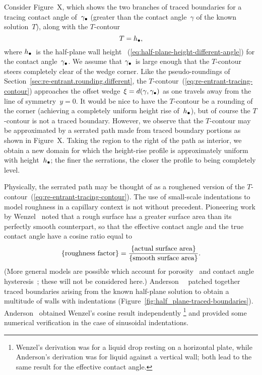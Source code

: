 Consider Figure~X, %
which shows the two branches of traced boundaries
for a tracing contact angle of~$\gamma_\bullet$
(greater than the contact angle~$\gamma$ of the known solution~$T$),
along with the $T$-contour
\begin{equation}
  T = h_\bullet,
  \label{eq:re-entrant-tracing-contour}
\end{equation}
where $h_\bullet$~is the half-plane wall height~%
  (\ref{eq:half-plane-height-different-angle})
for the contact angle~$\gamma_\bullet$.
We assume that $\gamma_\bullet$~is large enough
that the $T$-contour steers completely clear of the wedge corner.
Like the pseudo-roundings of Section~\ref{sec:re-entrant.rounding.different},
the $T$-contour~(\ref{eq:re-entrant-tracing-contour})
approaches the offset wedge~$\xi = d (\gamma, \gamma_\bullet)$
as one travels away from the line of symmetry~$y = 0$.
It would be nice to have the $T$-contour be a rounding of the corner
(achieving a completely uniform height rise of~$h_\bullet$),
but of course the $T$-contour is not a traced boundary.
However, we observe that the $T$-contour may be approximated
by a serrated path made from traced boundary portions
as shown in Figure~X. %
Taking the region to the right of the path as interior,
we obtain a new domain
for which the height-rise profile is approximately uniform
with height~$h_\bullet$;
the finer the serrations,
the closer the profile to being completely level.

Physically, the serrated path
may be thought of as a roughened version
of the $T$-contour~(\ref{eq:re-entrant-tracing-contour}).
The use of small-scale indentations
to model roughness in a capillary context
is not without precedent.
Pioneering work
by Wenzel~\cite{wenzel-1936-resistance-solid-surfaces-wetting}
noted that a rough surface has a greater surface area
than its perfectly smooth counterpart,
so that the effective contact angle and the true contact angle
have a cosine ratio equal to
\begin{equation}
  \left\{\textnormal{roughness factor}\right\} =
    \frac{\left\{\textnormal{actual surface area}\right\}}{\left\{\textnormal{smooth surface area}\right\}}.
  \label{eq:wenzel-roughness}
\end{equation}
(More general models are possible which account for
porosity~\cite{cassie-1944-wettability-porous-surfaces}
and contact angle hysteresis~\cite{
  cox-1983-spreading-liquid-rough-surface,
  johnson-1964-contact-angle-hysteresis
};
these will not be considered here.)
Anderson~\etal~\cite{anderson-2006-exact-solutions-laplace-young}
patched together traced boundaries
arising from the known half-plane solution
to obtain a multitude of walls with indentations
(Figure~\ref{fig:half_plane-traced-boundaries}).
Anderson~\cite[Section~6.4]{anderson-2002-thesis-boundary-tracing-pdes}
obtained Wenzel's cosine result independently%
\footnote{
  Wenzel's derivation was for a liquid drop resting on a horizontal plate,
  while Anderson's derivation was for liquid against a vertical wall;
  both lead to the same result for the effective contact angle.
}
and provided some numerical verification
in the case of sinusoidal indentations.

